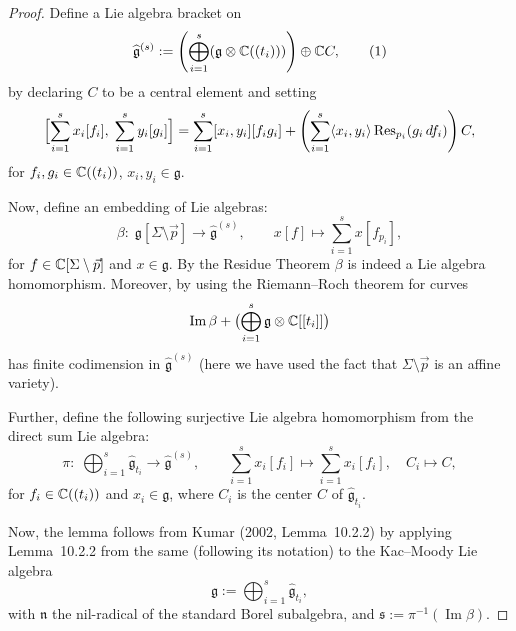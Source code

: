 \documentclass[12pt]{article}
\begin{document}
\begin{proof}
    Define a Lie algebra bracket on
    \[
        \widehat{\mathfrak g}^{(s)}
        := \left(\bigoplus_{i=1}^{s} (\mathfrak g \otimes \mathbb{C}((t_i)))\right)
        \oplus \mathbb{C} C,
        \tag{1}
    \]
    by declaring $C$ to be a central element and setting
    \[
        \Bigl[\sum_{i=1}^{s} x_i[f_i],\; \sum_{i=1}^{s} y_i[g_i]\Bigr]
        = \sum_{i=1}^{s} [x_i,y_i][f_i g_i]
        + \left(\sum_{i=1}^{s} \langle x_i, y_i\rangle
        \operatorname{Res}_{p_i}(g_i\,df_i)\right) C,
    \]
    for $f_i,g_i \in \mathbb{C}((t_i))$, $x_i,y_i \in \mathfrak g$.

    Now, define an embedding of Lie algebras:
    \[
        \beta:\;\mathfrak g[\Sigma\setminus\vec p]
        \longrightarrow \widehat{\mathfrak g}^{(s)},\qquad
        x[f] \longmapsto \sum_{i=1}^{s} x[f_{p_i}],
    \]
    for $f\in \mathbb{C}[\Sigma\setminus\vec p]$ and $x\in\mathfrak g$. By the Residue Theorem $\beta$ is indeed a Lie algebra homomorphism. Moreover, by using the Riemann--Roch theorem for curves \[\operatorname{Im}\beta + \bigl(\bigoplus_{i=1}^{s} \mathfrak g \otimes \mathbb{C}[[t_i]]\bigr)\]
    has finite codimension in $\widehat{\mathfrak g}^{(s)}$ (here we have used the fact that $\Sigma\setminus\vec p$ is an affine variety).

    Further, define the following surjective Lie algebra homomorphism
    from the direct sum Lie algebra:
    \[
        \pi:\;
        \bigoplus_{i=1}^{s} \widehat{\mathfrak g}_{t_i}
        \longrightarrow
        \widehat{\mathfrak g}^{(s)},\qquad
        \sum_{i=1}^{s} x_i[f_i] \longmapsto
        \sum_{i=1}^{s} x_i[f_i],\quad
        C_i \longmapsto C,
    \]
    for $f_i\in \mathbb{C}((t_i))$ and $x_i\in\mathfrak g$,
    where $C_i$ is the center $C$ of $\widehat{\mathfrak g}_{t_i}$.

    Now, the lemma follows from Kumar (2002, Lemma~10.2.2) by applying
    Lemma~10.2.2 from the same (following its notation)
    to the Kac--Moody Lie algebra
    \[
        \mathfrak g := \bigoplus_{i=1}^{s} \widehat{\mathfrak g}_{t_i},
    \]
    with $\mathfrak n$ the nil-radical of the standard Borel subalgebra,
    and $\mathfrak s := \pi^{-1}(\operatorname{Im}\beta)$. \end{proof}
\end{document}
